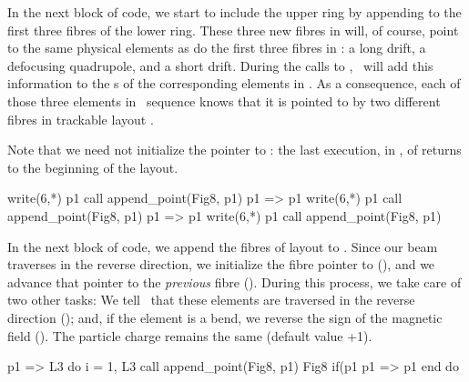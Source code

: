 %
In the next block of code, we start to include the upper ring by
appending to  the first three fibres of the lower ring.
These three new fibres in  will, of course, point to the
same physical elements as do the first three fibres in :
a long drift, a defocusing quadrupole, and a short drift. During
the calls to , \PTC\ will add this information
to the s of the corresponding elements in . As a
consequence, each of those three elements in \DNA\ sequence 
knows that it is pointed to by two different fibres in trackable
layout .%

Note that we need not initialize the pointer  to : the last execution, in , of  returns  to the beginning of the layout.
%
\begin{ptccode}
write(6,*) p1%
call append_point(Fig8, p1)
p1 => p1%
write(6,*) p1%
call append_point(Fig8, p1)
p1 => p1%
write(6,*) p1%
call append_point(Fig8, p1)
\end{ptccode}

In the next block of code, we append the fibres of layout 
to . Since our beam traverses  in the reverse
direction, we initialize the fibre pointer  to 
(), and we advance that pointer to the
\emph{previous} fibre (). During this process,
we take care of two other tasks: We tell \PTC\ that these elements
are traversed in the reverse direction (); and,
if the element is a bend, we reverse the sign of the magnetic field
(). The particle charge remains the same (default
value +1).
%
\begin{ptccode}
p1 => L3%
do i = 1, L3%
  call append_point(Fig8, p1)
  Fig8%
  if(p1%
  p1 => p1%
end do
\end{ptccode}

